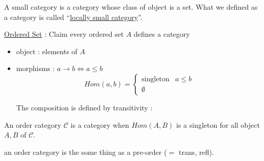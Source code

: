 \documentclass{article}
\theoremstyle{plain}
\begin{document}
   A small category is a category whose class of object is a set.
  What we defined as a category is called ``\underline{locally small category}''.

  \ex

  \underline{Ordered Set} : Claim every ordered set $A$ defines a category
    \begin{itemize}
      \item object : elements of $A$
      \item morphisms : $a \to b \Leftrightarrow a \leq b$
        \[ Hom(a, b) =
          \begin{cases}
            \text{singleton} & a \leq b \\
            \emptyset
          \end{cases} \]

      The composition is defined by transitivity :

        \begin{center}
        \end{center}       
    \end{itemize}

     An order category $\mathcal C$ is a category when $Hom(A,B)$ is a
    singleton for all object $A, B $ of $\mathcal C$.

    \obs an order category is the some thing as a pre-order ($=$ trans, refl).
\end{document}
